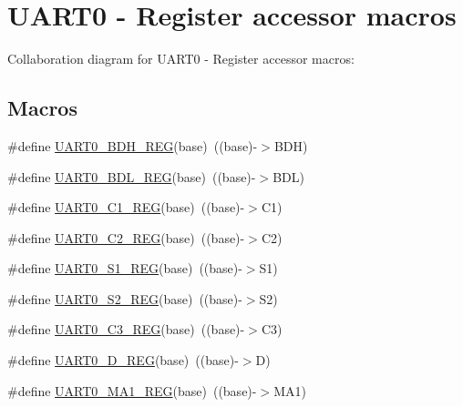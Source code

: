 \hypertarget{group___u_a_r_t0___register___accessor___macros}{}\section{U\+A\+R\+T0 -\/ Register accessor macros}
\label{group___u_a_r_t0___register___accessor___macros}
Collaboration diagram for U\+A\+R\+T0 -\/ Register accessor macros\+:
\subsection*{Macros}
\begin{DoxyCompactItemize}
\item 
\#define \hyperlink{group___u_a_r_t0___register___accessor___macros_ga92a738cb5fe10aaf02d85fb5c5b6a936}{U\+A\+R\+T0\+\_\+\+B\+D\+H\+\_\+\+R\+EG}(base)~((base)-\/$>$B\+DH)
\item 
\#define \hyperlink{group___u_a_r_t0___register___accessor___macros_gab76185bb7da61762628de2ad9b344da0}{U\+A\+R\+T0\+\_\+\+B\+D\+L\+\_\+\+R\+EG}(base)~((base)-\/$>$B\+DL)
\item 
\#define \hyperlink{group___u_a_r_t0___register___accessor___macros_gae73e3f20d2d62db8a394ae91114f482d}{U\+A\+R\+T0\+\_\+\+C1\+\_\+\+R\+EG}(base)~((base)-\/$>$C1)
\item 
\#define \hyperlink{group___u_a_r_t0___register___accessor___macros_ga040e10b824110fe8f17ea29b980de16c}{U\+A\+R\+T0\+\_\+\+C2\+\_\+\+R\+EG}(base)~((base)-\/$>$C2)
\item 
\#define \hyperlink{group___u_a_r_t0___register___accessor___macros_gacc27239085f84d5e5e4522405f885258}{U\+A\+R\+T0\+\_\+\+S1\+\_\+\+R\+EG}(base)~((base)-\/$>$S1)
\item 
\#define \hyperlink{group___u_a_r_t0___register___accessor___macros_ga60ac479ecfdaf9c926820c8d9fa304a3}{U\+A\+R\+T0\+\_\+\+S2\+\_\+\+R\+EG}(base)~((base)-\/$>$S2)
\item 
\#define \hyperlink{group___u_a_r_t0___register___accessor___macros_ga35fad3cd1f0ba155d9633ee934e8558b}{U\+A\+R\+T0\+\_\+\+C3\+\_\+\+R\+EG}(base)~((base)-\/$>$C3)
\item 
\#define \hyperlink{group___u_a_r_t0___register___accessor___macros_ga1ee897419a523f18221caa3abe1b3159}{U\+A\+R\+T0\+\_\+\+D\+\_\+\+R\+EG}(base)~((base)-\/$>$D)
\item 
\#define \hyperlink{group___u_a_r_t0___register___accessor___macros_ga7eaf50c73e903f89f97370dd87c507a5}{U\+A\+R\+T0\+\_\+\+M\+A1\+\_\+\+R\+EG}(base)~((base)-\/$>$M\+A1)

\end{DoxyCompactItemize}
